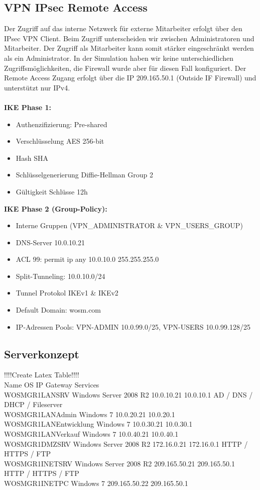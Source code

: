 \documentclass[11pt,a4paper,parskip=half]{scrartcl}
\begin{document}
\subsection{VPN IPsec Remote Access}
Der Zugriff auf das interne Netzwerk für externe Mitarbeiter erfolgt über den IPsec VPN Client. Beim Zugriff unterscheiden wir zwischen Administratoren und Mitarbeiter. Der Zugriff als Mitarbeiter kann somit stärker eingeschränkt werden als ein Administrator. In der Simulation haben wir keine unterschiedlichen Zugriffsmöglichkeiten, die Firewall wurde aber für diesen Fall konfiguriert. Der Remote Access Zugang erfolgt über die IP 209.165.50.1 (Outside IF Firewall) und unterstützt nur IPv4.\\
\\
\textbf{IKE Phase 1:}
\begin{itemize}
	\item{Authenzifizierung: Pre-shared}
	\item{Verschlüsselung AES 256-bit}
	\item{Hash SHA}
	\item{Schlüsselgenerierung Diffie-Hellman Group 2}
	\item{Gültigkeit Schlüsse 12h}
\end{itemize}

\textbf{IKE Phase 2 (Group-Policy):}
\begin{itemize}
	\item{Interne Gruppen (VPN\_ADMINISTRATOR \& VPN\_USERS\_GROUP)}
	\item{DNS-Server 10.0.10.21}
	\item{ACL 99: permit ip any 10.0.10.0 255.255.255.0 }
	\item{Split-Tunneling: 10.0.10.0/24}
	\item{Tunnel Protokol IKEv1 \& IKEv2}
	\item{Default Domain: wosm.com}
	\item{IP-Adressen Pools: VPN-ADMIN 10.0.99.0/25, VPN-USERS 10.0.99.128/25}
\end{itemize}


\subsection{Serverkonzept}
!!!!Create Latex Table!!!!\\
Name					OS					IP			Gateway		Services\\
WOSMGR1LANSRV			Windows Server 2008 R2		10.0.10.21		10.0.10.1		AD / DNS / DHCP / Fileserver\\
WOSMGR1LANAdmin		Windows 7				10.0.20.21		10.0.20.1\\
WOSMGR1LANEntwicklung		Windows 7				10.0.30.21		10.0.30.1\\
WOSMGR1LANVerkauf		Windows 7				10.0.40.21		10.0.40.1\\
WOSMGR1DMZSRV			Windows Server 2008 R2		172.16.0.21		172.16.0.1		HTTP / HTTPS / FTP\\
WOSMGR1INETSRV			Windows Server 2008 R2		209.165.50.21	209.165.50.1	HTTP / HTTPS / FTP\\
WOSMGR1INETPC			Windows 7				209.165.50.22	209.165.50.1\\
\end{document}
